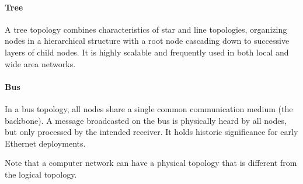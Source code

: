 \paragraph{Tree}
A tree topology combines characteristics of star and line topologies, organizing nodes in a hierarchical structure with a root node cascading down to successive layers of child nodes. It is highly scalable and frequently used in both local and wide area networks.
\begin{center}
\end{center}

\paragraph{Bus}
In a bus topology, all nodes share a single common communication medium (the backbone). A message broadcasted on the bus is physically heard by all nodes, but only processed by the intended receiver. It holds historic significance for early Ethernet deployments.
\begin{center}
\end{center}

\begin{example}{}
    Note that a computer network can have a physical topology that is different from the logical topology.
\end{example}

